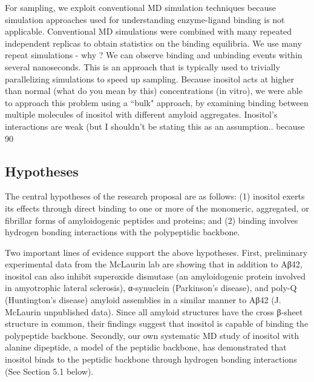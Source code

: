 For sampling, we exploit conventional MD simulation techniques because simulation approaches used for understanding enzyme-ligand binding is not applicable. Conventional MD simulations were combined with many repeated independent replicas to obtain statistics on the binding equilibria.  We use many repeat simulations - why ? We can observe binding and unbinding events within several nanoseconds.  This is an approach that is typically used to trivially parallelizing simulations to speed up sampling.  Because inositol acts at higher than normal (what do you mean by this) concentrations (in vitro), we were able to approach this problem using a ``bulk" approach, by examining binding between multiple molecules of inositol with different amyloid aggregates.  Inositol's interactions are  weak (but I shouldn't be stating this as an assumption.. because 90%

\subsection{Hypotheses}
The central hypotheses of the research proposal are as follows:  (1) inositol exerts its effects through direct binding to one or more of the monomeric, aggregated, or fibrillar forms of amyloidogenic peptides and proteins; and (2) binding involves hydrogen bonding interactions with the polypeptidic backbone.

	Two important lines of evidence support the above hypotheses.  First, preliminary experimental data from the McLaurin lab are showing that in addition to Aβ42, inositol can also inhibit superoxide dismutase (an amyloidogenic protein involved in amyotrophic lateral sclerosis), α-synuclein (Parkinson’s disease), and poly-Q (Huntington’s disease) amyloid assemblies in a similar manner to Aβ42 (J. McLaurin unpublished data).  Since all amyloid structures have the cross β-sheet structure in common, their findings suggest that inositol is capable of binding the polypeptide backbone.  Secondly, our own systematic MD study of inositol with alanine dipeptide, a model of the peptidic backbone, has demonstrated that inositol binds to the peptidic backbone through hydrogen bonding interactions (See Section 5.1 below).  

